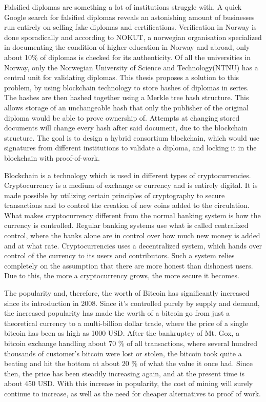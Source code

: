 \documentclass[12pt]{article}
\begin{document}
Falsified diplomas are something a lot of institutions struggle with. A quick Google search for falsified diplomas reveals an astonishing amount of businesses run entirely on selling fake diplomas and certifications. Verification in Norway is done sporadically and according to NOKUT, a norwegian organisation specialized in documenting the condition of higher education in Norway and abroad, only about 10\% of diplomas is checked for its authenticity\cite{NOKUT}. Of all the universities in Norway, only the Norwegian University of Science and Technology(NTNU) has a central unit for validating diplomas. This thesis proposes a solution to this problem, by using blockchain technology to store hashes of diplomas in series. The hashes are then hashed together using a Merkle tree hash structure. This allows storage of an unchangeable hash that only the publisher of the original diploma would be able to prove ownership of. Attempts at changing stored documents will change every hash after said document, due to the blockchain structure. The goal is to design a hybrid consortium blockchain, which would use signatures from different institutions to validate a diploma, and locking it in the blockchain with proof-of-work. 

Blockchain is a technology which is used in different types of cryptocurrencies. Cryptocurrency is a medium of exchange or currency and is entirely digital. It is made possible by utilizing certain principles of cryptography to secure transactions and to control the creation of new coins added to the circulation. What makes cryptocurrency different from the normal banking system is how the currency is controlled. Regular banking systems use what is called centralized control, where the banks alone are in control over how much new money is added and at what rate. Cryptocurrencies uses a decentralized system, which hands over control of the currency to its users and contributors. Such a system relies completely on the assumption that there are more honest than dishonest users. Due to this, the more a cryptocurrency grows, the more secure it becomes. 

The popularity and, therefore, the worth of Bitcoin has significantly increased since its introduction in 2008. Since it's controlled purely by supply and demand, the increased popularity has made the worth of a bitcoin go from just a theoretical currency to a multi-billion dollar trade, where the price of a single bitcoin has been as high as 1000 USD. After the bankruptcy of Mt. Gox, a bitcoin exchange handling about 70 \% of all transactions, where several hundred thousands of customer's bitcoin were lost or stolen, the bitcoin took quite a beating and hit the bottom at about 20 \% of what the value it once had. Since then, the price has been steadily increasing again, and at the present time is about 450 USD. With this increase in popularity, the cost of mining will surely continue to increase, as well as the need for cheaper alternatives to proof of work.
\end{document}
